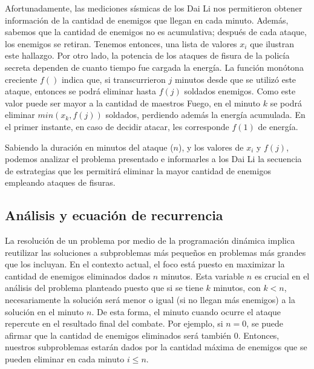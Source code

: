 \documentclass{article}
\begin{document}
Afortunadamente, las mediciones sísmicas de los Dai Li nos permitieron obtener información de la cantidad de enemigos que llegan en cada minuto. Además, sabemos que la cantidad de enemigos no es acumulativa; después de cada ataque, los enemigos se retiran. Tenemos entonces, una lista de valores $x_i$ que ilustran este hallazgo. Por otro lado, la potencia de los ataques de fisura de la policía secreta dependen de cuanto tiempo fue cargada la energía. La función monótona creciente $f()$ indica que, si transcurrieron $j$ minutos desde que se utilizó este ataque, entonces se podrá eliminar hasta  $f(j)$ soldados enemigos. Como este valor puede ser mayor a la cantidad de maestros Fuego, en el minuto $k$ se podrá eliminar $min(x_k, f(j))$ soldados, perdiendo además la energía acumulada. En el primer instante, en caso de decidir atacar, les corresponde $f(1)$ de energía.

Sabiendo la duración en minutos del ataque ($n$), y los valores de $x_i$ y $f(j)$, podemos analizar el problema presentado e informarles a los Dai Li la secuencia de estrategias que les permitirá eliminar la mayor cantidad de enemigos empleando ataques de fisuras.

\subsection{Análisis y ecuación de recurrencia}

La resolución de un problema por medio de la programación dinámica implica reutilizar las soluciones a subproblemas más pequeños en problemas más grandes que los incluyan. En el contexto actual, el foco está puesto en maximizar la cantidad de enemigos eliminados dados $n$ minutos. Esta variable $n$ es crucial en el análisis del problema planteado puesto que si se tiene $k$ minutos, con $k < n$, necesariamente la solución será menor o igual (si no llegan más enemigos) a la solución en el minuto $n$. De esta forma, el minuto cuando ocurre el ataque repercute en el resultado final del combate. Por ejemplo, si $n = 0$, se puede afirmar que la cantidad de enemigos eliminados será también 0. Entonces, nuestros subproblemas estarán dados por la cantidad máxima de enemigos que se pueden eliminar en cada minuto $i \leq n$.
\end{document}
